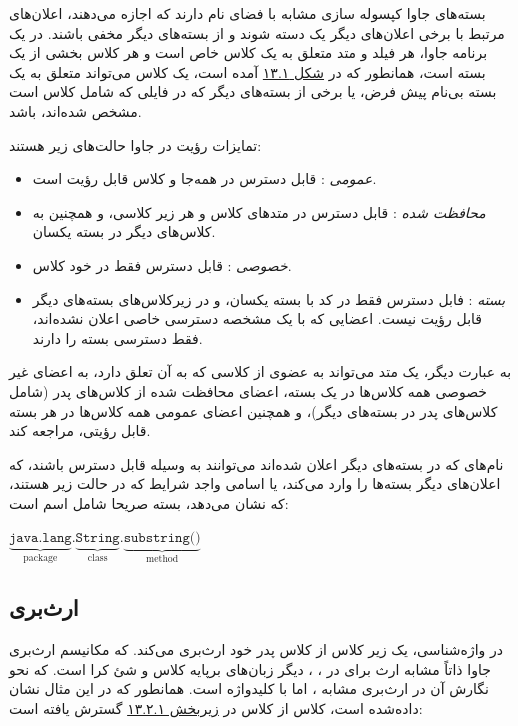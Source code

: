 \documentclass[a4paper,12pt]{report}
\newcommand{\lrm}[1]{{\color{steelBlue}\lr{\texttt{#1}}}}
\begin{document}
	بسته‌های جاوا کپسوله سازی مشابه با فضای نام 
	دارند که اجازه می‌دهند، اعلان‌های مرتبط با برخی اعلان‌های دیگر یک دسته شوند و از بسته‌های دیگر مخفی باشند. 
در یک برنامه جاوا، هر فیلد و متد متعلق به یک کلاس خاص است و هر کلاس بخشی از یک بسته است، همانطور که در 
	\hyperref[fig1:subsec2:sec2:chap13]{
	شکل ۱۳.۱}
	\linebreak
 آمده است، یک کلاس می‌تواند متعلق به یک بسته بی‌نام پیش فرض،‌ یا برخی از بسته‌های دیگر که در فایلی که شامل کلاس است مشخص شده‌اند، باشد.

	تمایزات رؤیت
	 در جاوا حالت‌های زیر هستند:
\begin{itemize}[nosep]
	\renewcommand{\labelitemi}{\color{gray}\scriptsize$\blacksquare$}
	\item
	\textit{
	عمومی
}: قابل دسترس در همه‌جا و کلاس قابل رؤیت است.
	\item\textit{
	محافظت شده
}: قابل دسترس در متد‌های کلاس و هر زیر کلاسی، و همچنین به کلاس‌های دیگر در بسته یکسان. 
	\item\textit{
	خصوصی
}: قابل دسترس فقط در خود کلاس.
	\item\textit{
		بسته
}: فابل دسترس فقط در کد با بسته یکسان، و در زیرکلاس‌های بسته‌های دیگر قابل رؤیت نیست. اعضایی که با یک مشخصه دسترسی خاصی اعلان نشده‌اند، فقط دسترسی بسته را دارند.
\end{itemize}

	به عبارت دیگر، یک متد می‌تواند به عضوی از کلاسی که به آن تعلق دارد، به اعضای غیر خصوصی همه کلاس‌ها در یک بسته، اعضای محافظت شده از کلاس‌های پدر (شامل کلاس‌های پدر در بسته‌های دیگر)، و همچنین اعضای عمومی همه کلاس‌ها در هر بسته قابل رؤیتی، مراجعه کند.
	
	نام‌های که در بسته‌های دیگر اعلان شده‌اند می‌توانند به وسیله 
	\lrm{import}
	قابل دسترس باشند، که اعلان‌های دیگر بسته‌ها را وارد می‌کند، یا اسامی واجد شرایط که در حالت زیر هستند، که  نشان می‌دهد، بسته صریحا شامل اسم است:  

\begin{latin}
	\color{steelBlue}
	$\underbrace{\texttt{java.lang}}_{\text{package}}.
	\underbrace{\texttt{String}}_{\text{class}}.
	\underbrace{\texttt{substring()}}_{\text{method}}$
\end{latin}

\subsection{
	ارث‌بری}
\label{subsec3:sec2:chap13}
	در واژه‌شناسی، یک زیر کلاس از کلاس پدر خود ارث‌بری می‌کند. که مکانیسم ارث‌بری جاوا ذاتاً مشابه ارث برای در 
	، 
	، دیگر زبان‌های برپایه کلاس و شئ کرا است. که نحو نگارش آن در ارث‌بری مشابه 
	، اما با کلیدواژه 
	\lrm{extends}
	است. همانطور که در این مثال نشان داده‌شده است، کلاس 
	\lrm{ColorPoint}
	از کلاس 
	\lrm{Point}
	در 
	\hyperref[subsec1:sec2:chap13]{
	زیربخش ۱۳.۲.۱} گسترش یافته است:
\end{document}
